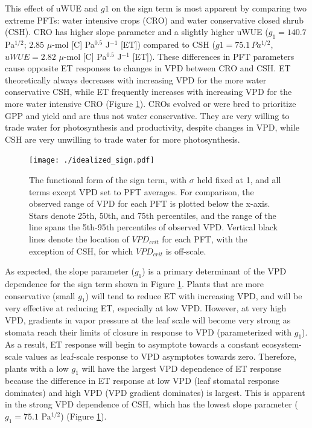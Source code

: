 \documentclass[draft,linenumbers]{agujournal}
\begin{document}
This effect of uWUE and $g1$ on the sign term is most apparent by
comparing two extreme PFTs: water intensive crops (CRO) and water
conservative closed shrub (CSH). CRO has higher slope parameter and a
slightly higher uWUE ($g_1 = 140.7$ Pa$^{1/2}$; $2.85$ $\mu$-mol [C]
Pa$^{0.5}$ J$^{-1}$ [ET]) compared to CSH ($g1 = 75.1 \, Pa^{1/2}$,
$uWUE=2.82$ $\mu$-mol [C] Pa$^{0.5}$ J$^{-1}$ [ET]). These differences
in PFT parameters cause opposite ET responses to changes in VPD
between CRO and CSH. ET theoretically always decreases with increasing
VPD for the more water conservative CSH, while ET frequently increases
with increasing VPD for the more water intensive CRO (Figure
\ref{idealized_sign}). CROs evolved or were bred to prioritize GPP and
yield and are thus not water conservative. They are very willing to
trade water for photosynthesis and productivity, despite changes in
VPD, while CSH are very unwilling to trade water for more
photosynthesis.

\begin{figure}
  \centering \texttt{[image: ./idealized\_sign.pdf]}
  \caption{The functional form of the sign term, with $\sigma$ held
    fixed at 1, and all terms except VPD set to PFT averages. For
    comparison, the observed range of VPD for each PFT is plotted
    below the x-axis. Stars denote 25th, 50th, and 75th percentiles,
    and the range of the line spans the 5th-95th percentiles of
    observed VPD. Vertical black lines denote the location of
    $VPD_{crit}$ for each PFT, with the exception of CSH, for which
    $VPD_{crit}$ is off-scale.}
  \label{idealized_sign}
\end{figure}


As expected, the slope parameter ($g_1$) is a primary determinant of
the VPD dependence for the sign term shown in Figure
\ref{idealized_sign}. Plants that are more conservative (small $g_1$)
will tend to reduce ET with increasing VPD, and will be very effective
at reducing ET, especially at low VPD. However, at very high VPD,
gradients in vapor pressure at the leaf scale will become very strong
as stomata reach their limits of closure in response to VPD
(parameterized with $g_1$). As a result, ET response will begin to
asymptote towards a constant ecosystem-scale values as leaf-scale
response to VPD asymptotes towards zero.  Therefore, plants with a low
$g_1$ will have the largest VPD dependence of ET response because the
difference in ET response at low VPD (leaf stomatal response
dominates) and high VPD (VPD gradient dominates) is largest. This is
apparent in the strong VPD dependence of CSH, which has the lowest
slope parameter ($g_1=75.1$ Pa$^{1/2}$) (Figure \ref{idealized_sign}).
\end{document}

